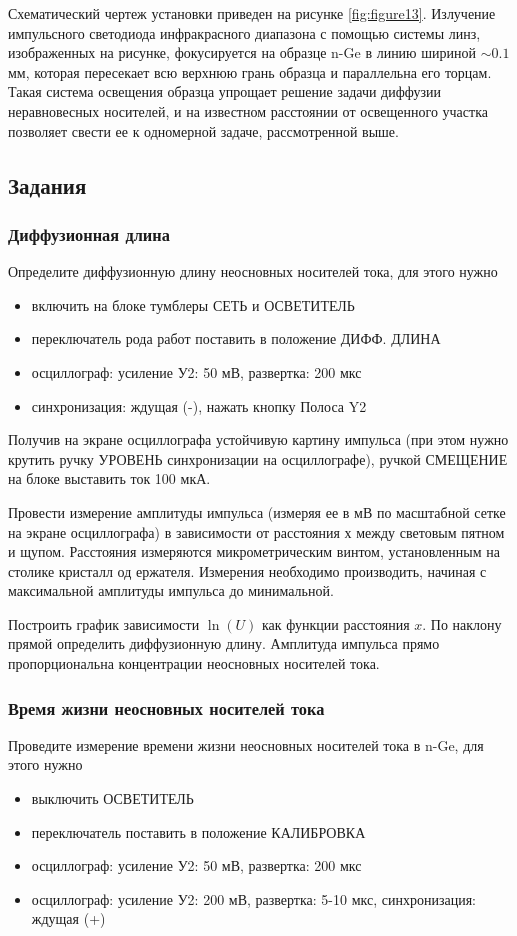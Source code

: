 \documentclass[a4paper,12pt]{article}
\begin{document}
Схематический чертеж установки приведен на рисунке \ref{fig:figure13}. Излучение импульсного светодиода инфракрасного диапазона с помощью системы линз, изображенных на рисунке, фокусируется на образце n-Ge в линию шириной $\sim0.1$ мм, которая пересекает всю верхнюю грань образца и параллельна его торцам. Такая система освещения образца упрощает решение задачи диффузии неравновесных носителей, и на известном расстоянии от освещенного участка позволяет свести ее к одномерной задаче, рассмотренной выше.

\subsection{Задания}
\subsubsection{Диффузионная длина}
Определите диффузионную длину неосновных носителей тока, для этого нужно
\begin{itemize}
	\item включить на блоке тумблеры СЕТЬ и ОСВЕТИТЕЛЬ
	\item переключатель рода работ поставить в положение ДИФФ. ДЛИНА
	\item осциллограф: усиление У2: 50 мВ, развертка: 200 мкс
	\item синхронизация: ждущая (-), нажать кнопку Полоса Y2
\end{itemize}
Получив на экране осциллографа устойчивую картину импульса (при этом нужно крутить ручку УРОВЕНЬ синхронизации на осциллографе), ручкой СМЕЩЕНИЕ на блоке выставить ток 100 мкА.

Провести измерение амплитуды импульса (измеряя ее в мВ по масштабной сетке на экране осциллографа) в зависимости от расстояния х между световым пятном и щупом. Расстояния измеряются микрометрическим винтом, установленным на столике кристалл од ержателя. Измерения необходимо производить, начиная с максимальной амплитуды импульса до минимальной.

Построить график зависимости $\ln(U)$ как функции расстояния $x$. По наклону прямой определить диффузионную длину. Амплитуда импульса прямо пропорциональна концентрации неосновных носителей тока.

\subsubsection{Время жизни неосновных носителей тока}
Проведите измерение времени жизни неосновных носителей тока в n-Ge, для этого нужно
\begin{itemize}
	\item выключить ОСВЕТИТЕЛЬ
	\item переключатель поставить в положение КАЛИБРОВКА
	\item осциллограф: усиление У2: 50 мВ, развертка: 200 мкс
	\item осциллограф: усиление У2: 200 мВ, развертка: 5-10 мкс, синхронизация: ждущая (+)
\end{itemize}
\end{document}
